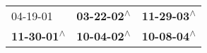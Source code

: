 \begin{supertabular}{lll}
                  04-19-01\textsuperscript{} &  \textbf{03-22-02\textsuperscript{$\wedge$}} &  \textbf{11-29-03\textsuperscript{$\wedge$}} \\
 \textbf{11-30-01\textsuperscript{$\wedge$}} &  \textbf{10-04-02\textsuperscript{$\wedge$}} &  \textbf{10-08-04\textsuperscript{$\wedge$}} \\
\end{supertabular}
